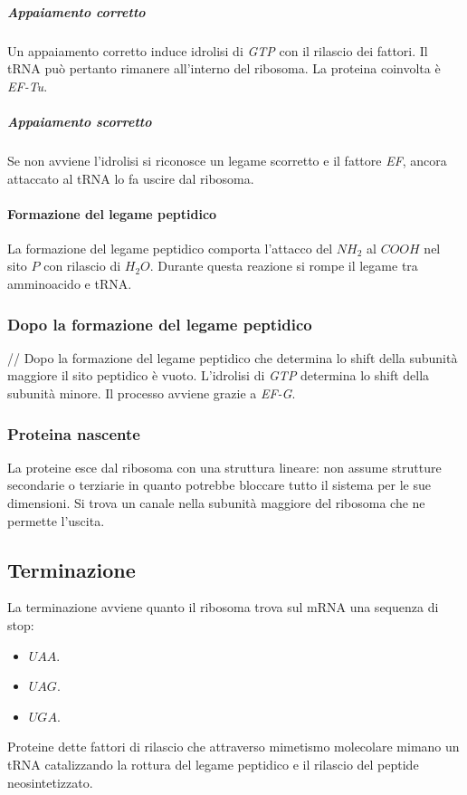 				\subparagraph{Appaiamento corretto}
				Un appaiamento corretto induce idrolisi di \emph{GTP} con il rilascio dei fattori.
				Il tRNA pu\`o pertanto rimanere all'interno del ribosoma.
				La proteina coinvolta \`e \emph{EF-Tu}.
					
				\subparagraph{Appaiamento scorretto}
				Se non avviene l'idrolisi si riconosce un legame scorretto e il fattore \emph{EF}, ancora attaccato al tRNA lo fa uscire dal ribosoma.

			\paragraph{Formazione del legame peptidico}
			La formazione del legame peptidico comporta l'attacco del \emph{$NH_2$} al \emph{$COOH$} nel sito $P$ con rilascio di \emph{$H_2O$}.
			Durante questa reazione si rompe il legame tra amminoacido e tRNA.

		\subsubsection{Dopo la formazione del legame peptidico}//
		Dopo la formazione del legame peptidico che determina lo shift della subunit\`a maggiore il sito peptidico \`e vuoto.
		L'idrolisi di \emph{GTP} determina lo shift della subunit\`a minore.
		Il processo avviene grazie a \emph{EF-G}.

		\subsubsection{Proteina nascente}
		La proteine esce dal ribosoma con una struttura lineare: non assume strutture secondarie o terziarie in quanto potrebbe bloccare tutto il sistema per le sue dimensioni.
		Si trova un canale nella subunit\`a maggiore del ribosoma che ne permette l'uscita.

	\subsection{Terminazione}
	La terminazione avviene quanto il ribosoma trova sul mRNA una sequenza di stop:
	\begin{multicols}{3}
		\begin{itemize}
			\item $UAA$.
			\item $UAG$.
			\item $UGA$.
		\end{itemize}
	\end{multicols}
	Proteine dette fattori di rilascio che attraverso mimetismo molecolare mimano un tRNA catalizzando la rottura del legame peptidico e il rilascio del peptide neosintetizzato.

